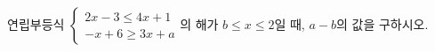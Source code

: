 연립부등식 $\begin{cases} 2x-3\le 4x+1 \\ -x+6\ge 3x+a \end{cases}$의 해가 $b\le x\le 2$일 때, $a-b$의 값을 구하시오. 
